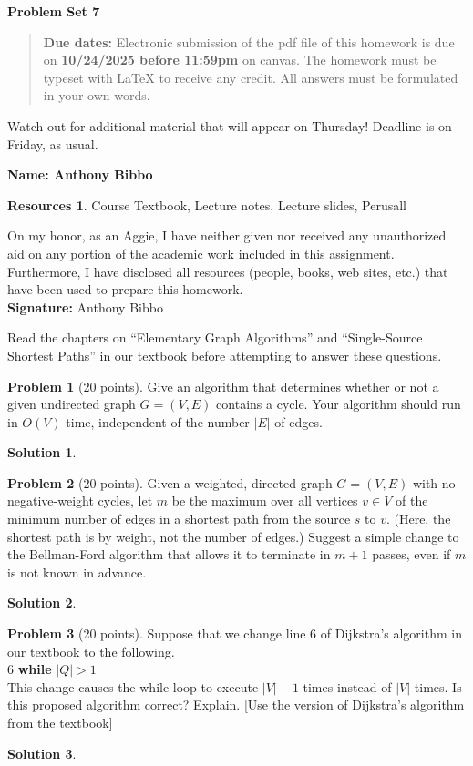 \documentclass{article}
\theoremstyle{definition}
\newtheorem{problem}{Problem}
\newtheorem*{solution}{Solution}
\newtheorem*{resources}{Resources}
\newcommand{\name}[1]{\noindent\textbf{Name: #1}}
\newcommand{\honor}{\noindent On my honor, as an Aggie, I have neither
  given nor received any unauthorized aid on any portion of the
  academic work included in this assignment. Furthermore, I have
  disclosed all resources (people, books, web sites, etc.) that have
  been used to prepare this homework. \\[1ex]
 \textbf{Signature:} Anthony Bibbo }
\newcommand{\problemset}[1]{\begin{center}\textbf{Problem Set
      #1}\end{center}}
\newcommand{\duedate}[2]{\begin{quote}\textbf{Due dates:} Electronic
    submission of the pdf file of this homework is due on
    \textbf{#1} on canvas. The homework must be typeset with LaTeX to
    receive any credit. All answers must be formulated in your own words.\end{quote} }
\begin{document}
\problemset{7}
\duedate{10/24/2025 before 11:59pm}

\textbf{Watch out for additional material that will appear on
  Thursday! Deadline is on Friday, as usual.} 

\name{ Anthony Bibbo}
\begin{resources} Course Textbook, Lecture notes, Lecture slides, Perusall
\end{resources}
\honor


\newpage


Read the chapters on ``Elementary Graph Algorithms'' and
``Single-Source Shortest Paths'' in our textbook before
attempting to answer these questions.

\begin{problem}[20 points]
Give an algorithm that determines whether or not a given undirected
graph $G=(V,E)$ contains a cycle. Your algorithm should run in $O(V)$
time, independent of the number $|E|$ of edges. 
\end{problem}
\begin{solution}
\end{solution}

\begin{problem}[20 points]
Given a weighted, directed graph $G=(V,E)$ with no negative-weight
cycles, let $m$ be the maximum over all vertices $v\in V$ of the minimum
number of edges in a shortest path from the source $s$ to $v$. (Here, the
shortest path is by weight, not the number of edges.) Suggest a simple
change to the Bellman-Ford algorithm that allows it to terminate in $m+1$
passes, even if $m$ is not known in advance.
\end{problem}
\begin{solution}
\end{solution}

\begin{problem}[20 points]
Suppose that we change line 6 of Dijkstra’s algorithm in our textbook
to the following.\\[1ex]
6 \textbf{while} $|Q| > 1$ \\[1ex] 
This change causes the while loop to execute $|V|-1$ times instead of
$|V |$ times. Is this proposed algorithm correct? Explain. 
[Use the version of Dijkstra's algorithm from the textbook]
\end{problem}
\begin{solution}
\end{solution}
\end{document}
